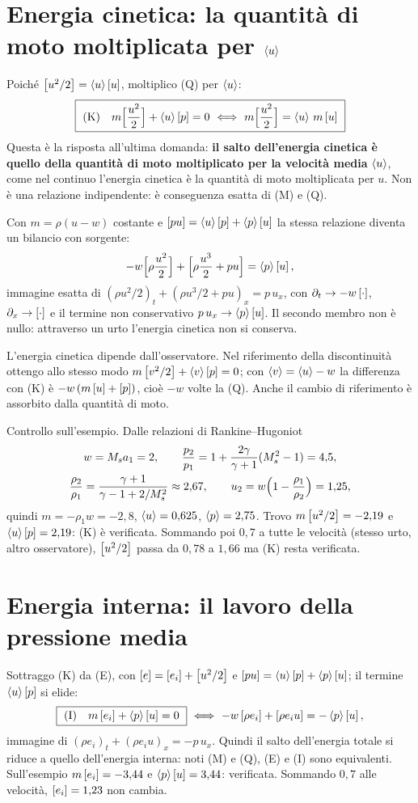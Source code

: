\section*{Energia cinetica: la quantità di moto moltiplicata per $\left\langle u\right\rangle$}
Poiché $\left[u^2/2\right]=\left\langle u\right\rangle\left[u\right]$, moltiplico (Q) per $\left\langle u\right\rangle$:
\[
  \boxed{\ \text{(K)}\quad m\Bigl[\frac{u^2}{2}\Bigr]+\av{u}\jp{p}=0
  \ \Longleftrightarrow\ m\Bigl[\frac{u^2}{2}\Bigr]=\av{u}\,m\jp{u}\ }
\]
Questa è la risposta all'ultima domanda: \textbf{il salto dell'energia cinetica è quello della quantità di moto
moltiplicato per la velocità media} $\left\langle u\right\rangle$, come nel continuo l'energia cinetica è la quantità di moto
moltiplicata per $u$. Non è una relazione indipendente: è conseguenza esatta di (M) e (Q).

Con $m=\rho(u-w)$ costante e $\left[pu\right]=\left\langle u\right\rangle\left[p\right]+\left\langle p\right\rangle\left[u\right]$ la stessa relazione diventa un bilancio con
sorgente:
\[
  -w\Bigl[\rho\frac{u^2}{2}\Bigr]+\Bigl[\rho\frac{u^3}{2}+pu\Bigr]=\left\langle p\right\rangle\left[u\right],
\]
immagine esatta di $(\rho u^2/2)_t+(\rho u^3/2+pu)_x=p\,u_x$, con $\partial_t\to-w\left[\cdot\right]$,
$\partial_x\to\left[\cdot\right]$ e il termine non conservativo $p\,u_x\to\left\langle p\right\rangle\left[u\right]$. Il secondo membro non è nullo:
attraverso un urto l'energia cinetica non si conserva.

L'energia cinetica dipende dall'osservatore. Nel riferimento della discontinuità ottengo allo stesso modo
$m\left[v^2/2\right]+\left\langle v\right\rangle\left[p\right]=0$; con $\left\langle v\right\rangle=\left\langle u\right\rangle-w$ la differenza con (K) è $-w\,(m\left[u\right]+\left[p\right])$, cioè $-w$ volte
la (Q). Anche il cambio di riferimento è assorbito dalla quantità di moto.

Controllo sull'esempio. Dalle relazioni di Rankine--Hugoniot
\begin{gather*}
  w=M_{s} a_1=2 ,\qquad \frac{p_2}{p_1}=1+\frac{2\gamma}{\gamma+1}(M_{s}^2-1)=4{,}5,\\
  \frac{\rho_2}{\rho_1}=\frac{\gamma+1}{\gamma-1+2/M_{s}^2}\approx2{,}67 ,\qquad
  u_2=w\Bigl(1-\frac{\rho_1}{\rho_2}\Bigr)=1{,}25,
\end{gather*}
quindi $m=-\rho_1w=-2{,}8$, $\left\langle u\right\rangle=0{,}625$, $\left\langle p\right\rangle=2{,}75$. Trovo $m\left[u^2/2\right]=-2{,}19$ e $\left\langle u\right\rangle\left[p\right]=2{,}19$:
(K) è verificata. Sommando poi $0{,}7$ a tutte le velocità (stesso urto, altro osservatore), $\left[u^2/2\right]$ passa da
$0{,}78$ a $1{,}66$ ma (K) resta verificata.

\section*{Energia interna: il lavoro della pressione media}
Sottraggo (K) da (E), con $\left[e\right]=\left[e_i\right]+\left[u^2/2\right]$ e $\left[pu\right]=\left\langle u\right\rangle\left[p\right]+\left\langle p\right\rangle\left[u\right]$; il termine
$\left\langle u\right\rangle\left[p\right]$ si elide:
\[
  \boxed{\ \text{(I)}\quad m\left[e_i\right]+\left\langle p\right\rangle\left[u\right]=0\ }
  \ \Longleftrightarrow\
  -w\left[\rho e_i\right]+\left[\rho e_iu\right]=-\left\langle p\right\rangle\left[u\right],
\]
immagine di $(\rho e_i)_t+(\rho e_iu)_x=-p\,u_x$. Quindi il salto dell'energia totale si riduce a quello
dell'energia interna: noti (M) e (Q), (E) e (I) sono equivalenti. Sull'esempio $m\left[e_i\right]=-3{,}44$ e
$\left\langle p\right\rangle\left[u\right]=3{,}44$: verificata. Sommando $0{,}7$ alle velocità, $\left[e_i\right]=1{,}23$ non cambia.

